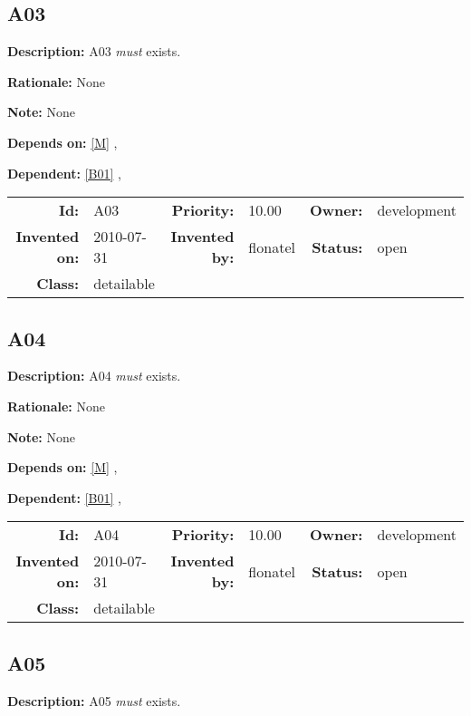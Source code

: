 \subsection{A03}\label{A03}
\textbf{Description:} A03 \textsl{must} exists.

\textbf{Rationale:} None

\textbf{Note:} None

\textbf{Depends on:} \ref{M} , 

\textbf{Dependent:} \ref{B01} , 

\par
{\small \begin{center}\begin{tabular}{rlrlrl}
\textbf{Id:} & A03 & \textbf{Priority:} & 10.00 & \textbf{Owner:} & development \\ 
\textbf{Invented on:} & 2010-07-31 & \textbf{Invented by:} & flonatel & \textbf{Status:} & open \\ 
\textbf{Class:} & detailable & & & & \\ 
\end{tabular}\end{center} }%
\subsection{A04}\label{A04}
\textbf{Description:} A04 \textsl{must} exists.

\textbf{Rationale:} None

\textbf{Note:} None

\textbf{Depends on:} \ref{M} , 

\textbf{Dependent:} \ref{B01} , 

\par
{\small \begin{center}\begin{tabular}{rlrlrl}
\textbf{Id:} & A04 & \textbf{Priority:} & 10.00 & \textbf{Owner:} & development \\ 
\textbf{Invented on:} & 2010-07-31 & \textbf{Invented by:} & flonatel & \textbf{Status:} & open \\ 
\textbf{Class:} & detailable & & & & \\ 
\end{tabular}\end{center} }%
\subsection{A05}\label{A05}
\textbf{Description:} A05 \textsl{must} exists.

